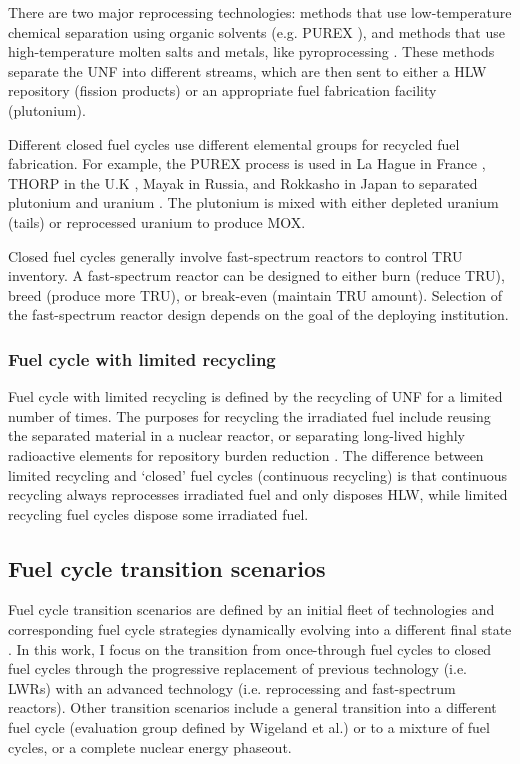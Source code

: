 There are two major reprocessing technologies:
methods that use low-temperature chemical separation
using organic solvents (e.g. PUREX \cite{baumgaertner_purex_1976}), and
methods that use high-temperature molten salts and metals, like pyroprocessing
\cite{laidler_development_1997}. These methods separate the \gls{UNF}
into different streams, which are then sent to either a \gls{HLW} repository
(fission products) or an appropriate fuel fabrication facility (plutonium).

Different closed fuel cycles use different elemental groups for recycled
fuel fabrication. For example, the PUREX process is used in La Hague in France
\cite{schneider_spent_2008}, THORP in the U.K \cite{riley_technology_1998},
Mayak in Russia, and Rokkasho in Japan to separated plutonium and uranium
\cite{birkett_recent_2005}. The plutonium is mixed with either depleted
uranium (tails) or reprocessed uranium to produce \gls{MOX}.

Closed fuel cycles
generally involve fast-spectrum reactors to control TRU inventory.
A fast-spectrum reactor can be designed to either burn (reduce TRU),
breed (produce more TRU), or break-even (maintain TRU amount).
Selection of the fast-spectrum reactor design depends on the
goal of the deploying institution.


\subsubsection{Fuel cycle with limited recycling}
Fuel cycle with limited recycling is defined by the recycling of \gls{UNF}
for a limited number of times. 
The purposes for recycling the irradiated fuel include
reusing the separated material in a nuclear reactor, or 
separating long-lived highly radioactive elements
for repository burden reduction \cite{wigeland_nuclear_2014}.
The difference
between limited recycling and `closed' fuel cycles (continuous
recycling) is that continuous recycling always reprocesses
irradiated fuel and only disposes \gls{HLW}, while limited
recycling fuel cycles dispose some irradiated fuel.


\subsection{Fuel cycle transition scenarios}
Fuel cycle transition scenarios are defined by an initial
fleet of technologies and corresponding fuel cycle strategies
dynamically evolving into a different final state \cite{oecd_nuclear_2009}.
In this work, I focus on the transition from
once-through fuel cycles to closed fuel
cycles through the progressive replacement of previous technology
(i.e. \glspl{LWR}) with an advanced technology (i.e. reprocessing
and fast-spectrum reactors). Other transition scenarios include
a general transition into a different fuel cycle (evaluation group
defined by Wigeland et al.) or to a mixture of fuel cycles, or
a complete nuclear energy phaseout.


